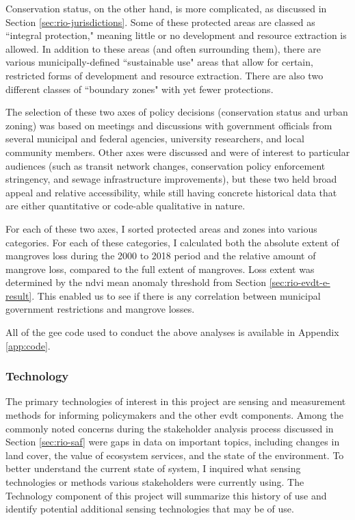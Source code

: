 Conservation status, on the other hand, is more complicated, as discussed in Section \ref{sec:rio-jurisdictions}. Some of these protected areas are classed as ``integral protection," meaning little or no development and resource extraction is allowed. In addition to these areas (and often surrounding them), there are various municipally-defined ``sustainable use" areas that allow for certain, restricted forms of development and resource extraction. There are also two different classes of ``boundary zones" with yet fewer protections.

The selection of these two axes of policy decisions (conservation status and urban zoning) was based on meetings and discussions with government officials from several municipal and federal agencies, university researchers, and local community members. Other axes were discussed and were of interest to particular audiences (such as transit network changes, conservation policy enforcement stringency, and sewage infrastructure improvements), but these two held broad appeal and relative accessibility, while still having concrete historical data that are either quantitative or code-able qualitative in nature. 

For each of these two axes, I sorted protected areas and zones into various categories. For each of these categories, I calculated both the absolute extent of mangroves loss during the 2000 to 2018 period and the relative amount of mangrove loss, compared to the full extent of mangroves. Loss extent was determined by the \ac{ndvi} mean anomaly threshold from Section \ref{sec:rio-evdt-e-result}. This enabled us to see if there is any correlation between municipal government restrictions and mangrove losses.

All of the \ac{gee} code used to conduct the above analyses is available in Appendix \ref{app:code}.

\subsubsection{Technology}

The primary technologies of interest in this project are sensing and measurement methods for informing policymakers and the other \ac{evdt} components. Among the commonly noted concerns during the stakeholder analysis process discussed in Section \ref{sec:rio-saf} were gaps in data on important topics, including changes in land cover, the value of ecosystem services, and the state of the environment. To better understand the current state of system, I inquired what sensing technologies or methods various stakeholders were currently using. The Technology component of this project will summarize this history of use and identify potential additional sensing technologies that may be of use. 

